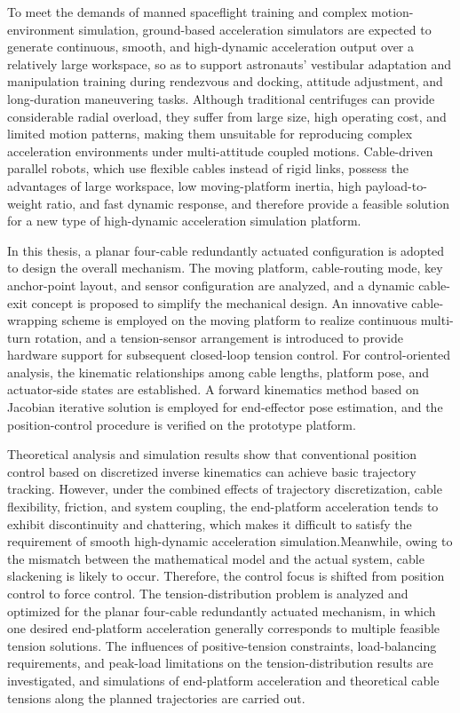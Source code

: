 \begin{eabstract}

To meet the demands of manned spaceflight training and complex motion-environment simulation, ground-based acceleration simulators are expected to generate continuous, smooth, and high-dynamic acceleration output over a relatively large workspace, so as to support astronauts' vestibular adaptation and manipulation training during rendezvous and docking, attitude adjustment, and long-duration maneuvering tasks. Although traditional centrifuges can provide considerable radial overload, they suffer from large size, high operating cost, and limited motion patterns, making them unsuitable for reproducing complex acceleration environments under multi-attitude coupled motions. Cable-driven parallel robots, which use flexible cables instead of rigid links, possess the advantages of large workspace, low moving-platform inertia, high payload-to-weight ratio, and fast dynamic response, and therefore provide a feasible solution for a new type of high-dynamic acceleration simulation platform.

In this thesis, a planar four-cable redundantly actuated configuration is adopted to design the overall mechanism. The moving platform, cable-routing mode, key anchor-point layout, and sensor configuration are analyzed, and a dynamic cable-exit concept is proposed to simplify the mechanical design. An innovative cable-wrapping scheme is employed on the moving platform to realize continuous multi-turn rotation, and a tension-sensor arrangement is introduced to provide hardware support for subsequent closed-loop tension control. For control-oriented analysis, the kinematic relationships among cable lengths, platform pose, and actuator-side states are established. A forward kinematics method based on Jacobian iterative solution is employed for end-effector pose estimation, and the position-control procedure is verified on the prototype platform.

Theoretical analysis and simulation results show that conventional position control based on discretized inverse kinematics can achieve basic trajectory tracking. However, under the combined effects of trajectory discretization, cable flexibility, friction, and system coupling, the end-platform acceleration tends to exhibit discontinuity and chattering, which makes it difficult to satisfy the requirement of smooth high-dynamic acceleration simulation.Meanwhile, owing to the mismatch between the mathematical model and the actual system, cable slackening is likely to occur. Therefore, the control focus is shifted from position control to force control. The tension-distribution problem is analyzed and optimized for the planar four-cable redundantly actuated mechanism, in which one desired end-platform acceleration generally corresponds to multiple feasible tension solutions. The influences of positive-tension constraints, load-balancing requirements, and peak-load limitations on the tension-distribution results are investigated, and simulations of end-platform acceleration and theoretical cable tensions along the planned trajectories are carried out.


\end{eabstract}
